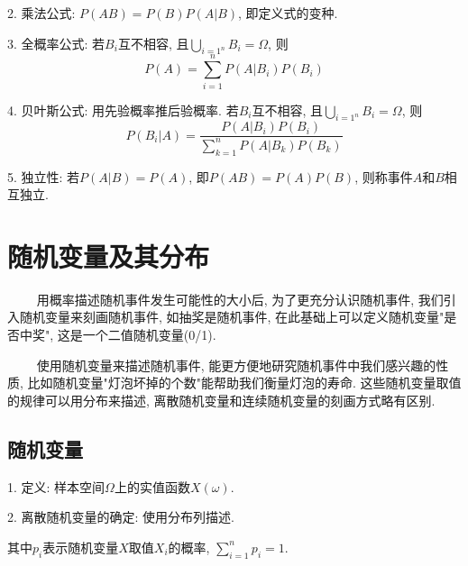 2. 乘法公式: $P(AB)=P(B)P(A|B)$, 即定义式的变种.

3. 全概率公式: 若$B_i$互不相容, 且$\bigcup\limits_{i=1^n}B_i=\Omega$, 则
\begin{equation*}
    P(A)=\sum\limits_{i=1}^n P(A|B_i)P(B_i)
\end{equation*}

4. 贝叶斯公式: 用先验概率推后验概率.  若$B_i$互不相容, 且$\bigcup\limits_{i=1^n}B_i=\Omega$, 则
\begin{equation*}
    P(B_i|A)=\frac{P(A|B_i)P(B_i)}{\sum\limits_{k=1}^n P(A|B_k)P(B_k)}
\end{equation*}

5. 独立性: 若$P(A|B)=P(A)$, 即$P(AB)=P(A)P(B)$, 则称事件$A$和$B$相互独立.

\section{随机变量及其分布}

\begin{tcolorbox}[colback=red!5,colframe=red!75!black]
    ~~~~ 用概率描述随机事件发生可能性的大小后, 为了更充分认识随机事件, 我们引入随机变量来刻画随机事件, 如抽奖是随机事件, 在此基础上可以定义随机变量"是否中奖", 这是一个二值随机变量(0/1). 

    ~~~~ 使用随机变量来描述随机事件, 能更方便地研究随机事件中我们感兴趣的性质, 比如随机变量"灯泡坏掉的个数"能帮助我们衡量灯泡的寿命. 这些随机变量取值的规律可以用分布来描述, 离散随机变量和连续随机变量的刻画方式略有区别.

\end{tcolorbox}

\subsection{随机变量}

1. 定义: 样本空间$\Omega$上的实值函数$X(\omega)$. 

2. 离散随机变量的确定: 使用分布列描述.

\begin{table}[H]
    \centering
\end{table}

其中$p_i$表示随机变量$X$取值$X_i$的概率, $\sum\limits_{i=1}^n p_i=1$.

